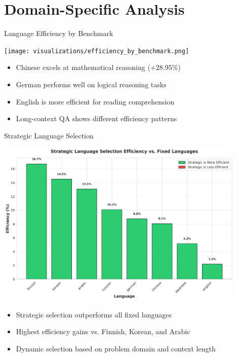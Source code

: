 \documentclass{beamer}
\begin{document}
\section{Domain-Specific Analysis}

\begin{frame}{Language Efficiency by Benchmark}
    \begin{center}
        \texttt{[image: visualizations/efficiency\_by\_benchmark.png]}
    \end{center}
    
    \begin{itemize}
        \item Chinese excels at mathematical reasoning (+28.95\%)
        \item German performs well on logical reasoning tasks
        \item English is more efficient for reading comprehension
        \item Long-context QA shows different efficiency patterns
    \end{itemize}
\end{frame}

\begin{frame}{Strategic Language Selection}
    \begin{center}
        \includegraphics[width=0.9\textwidth]{visualizations/presentation/strategic_selection_efficiency.png}
    \end{center}
    
    \begin{itemize}
        \item Strategic selection outperforms all fixed languages
        \item Highest efficiency gains vs. Finnish, Korean, and Arabic
        \item Dynamic selection based on problem domain and context length
    \end{itemize}
\end{frame}
\end{document}
